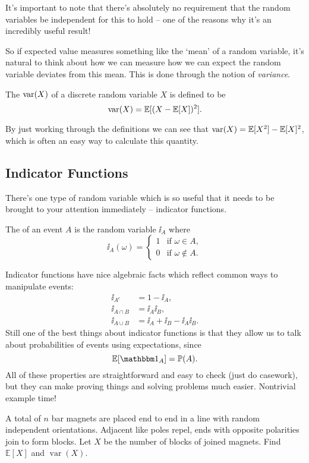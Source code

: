 \documentclass[10pt, a4paper]{article}
\begin{document}
It's important to note that there's absolutely no requirement that the random variables be independent for this to hold -- one of the reasons why it's an incredibly useful result!

So if expected value measures something like the `mean' of a random variable, it's natural to think about how we can measure how we can expect the random variable deviates from this mean. This is done through the notion of \emph{variance}.

\begin{definition}[Variance]
	The  $\operatorname{var}(X)$ of a discrete random variable $X$ is defined to be
	$$
\operatorname{var}(X) = \mathbb{E}[(X - \mathbb{E}[X])^2].
	$$
\end{definition}

By just working through the definitions we can see that $\operatorname{var}(X) = \mathbb{E}[X^2] - \mathbb{E}[X]^2$, which is often an easy way to calculate this quantity.

\subsection{Indicator Functions}

There's one type of random variable which is so useful that it needs to be brought to your attention immediately -- indicator functions.

\begin{definition}
	The  of an event $A$ is the random variable $\ii_A$ where
	$$
\ii_A(\omega) = \begin{cases}
	1 &\mbox{if } \omega  \in A, \\
	0 &\mbox{if } \omega  \not \in A.
   \end{cases}
	$$
\end{definition}

Indicator functions have nice algebraic facts which reflect common ways to manipulate events:
\begin{align*}
	\ii_{A^c} &= 1 - \ii_A, \\
	\ii_{A \cap B} &= \ii_A \ii_B, \\
	\ii_{A \cup B} &= \ii_A + \ii_B - \ii_A \ii_B.
\end{align*}
Still one of the best things about indicator functions is that they allow us to talk about probabilities of events using expectations, since
$$
\EE[\ii_A]= \PP(A).
$$
All of these properties are straightforward and easy to check (just do casework), but they can make proving things and solving problems much easier. Nontrivial example time!

\begin{problem}
A total of $n$ bar magnets are placed end to end in a line with random independent orientations. Adjacent like poles repel, ends with opposite polarities join to form blocks. Let $X$ be the number of blocks of joined magnets. Find $\mathbb{E}[X]$ and $\operatorname{var}(X)$.
\end{problem}
\end{document}
